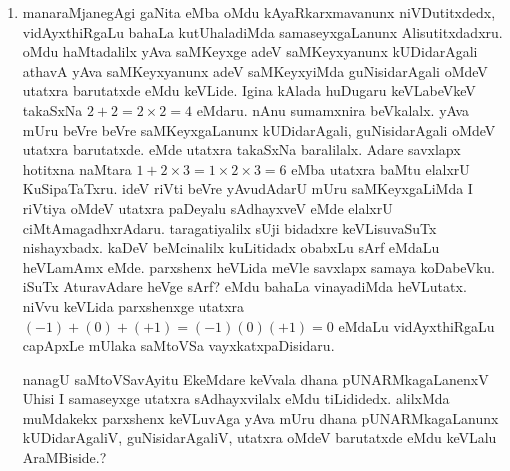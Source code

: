 \begin{enumerate}[\rm 1)]
\item manaraMjanegAgi gaNita eMba oMdu kAyaRkarxmavanunx niVDutitxdedx, vidAyxthiRgaLu bahaLa kutUhaladiMda samaseyxgaLanunx Alisutitxdadxru. oMdu haMtadalilx yAva saMKeyxge adeV saMKeyxyanunx kUDidarAgali athavA yAva saMKeyxyanunx adeV saMKeyxyiMda guNisidarAgali oMdeV utatxra barutatxde eMdu keVLide. Igina kAlada huDugaru keVLabeVkeV takaSxNa $2+2=2\times 2=4$ eMdaru. nAnu sumamxnira beVkalalx. yAva mUru beVre beVre saMKeyxgaLanunx kUDidarAgali, guNisidarAgali oMdeV utatxra barutatxde. eMde utatxra takaSxNa baralilalx. Adare savxlapx hotitxna naMtara $1+2\times 3=1\times 2\times 3=6$ eMba utatxra baMtu elalxrU KuSipaTaTxru. ideV riVti beVre yAvudAdarU mUru saMKeyxgaLiMda I riVtiya oMdeV utatxra paDeyalu sAdhayxveV eMde elalxrU ciMtAmagadhxrAdaru. taragatiyalilx sUji bidadxre keVLisuvaSuTx nishayxbadx. kaDeV beMcinalilx kuLitidadx obabxLu sArf eMdaLu heVLamAmx eMde. parxshenx heVLida meVle savxlapx samaya koDabeVku. iSuTx AturavAdare heVge sArf? eMdu bahaLa vinayadiMda heVLutatx. niVvu keVLida parxshenxge utatxra $(-1)+(0)+(+1)=(-1)(0)(+1)=0$ eMdaLu vidAyxthiRgaLu capApxLe mUlaka saMtoVSa vayxkatxpaDisidaru. 

nanagU saMtoVSavAyitu EkeMdare keVvala dhana pUNARMkagaLanenxV Uhisi I samaseyxge utatxra sAdhayxvilalx eMdu tiLididedx. alilxMda muMdakekx parxshenx keVLuvAga yAva mUru dhana pUNARMkagaLanunx kUDidarAgaliV, guNisidarAgaliV, utatxra oMdeV barutatxde eMdu keVLalu AraMBiside.?
\end{enumerate}





